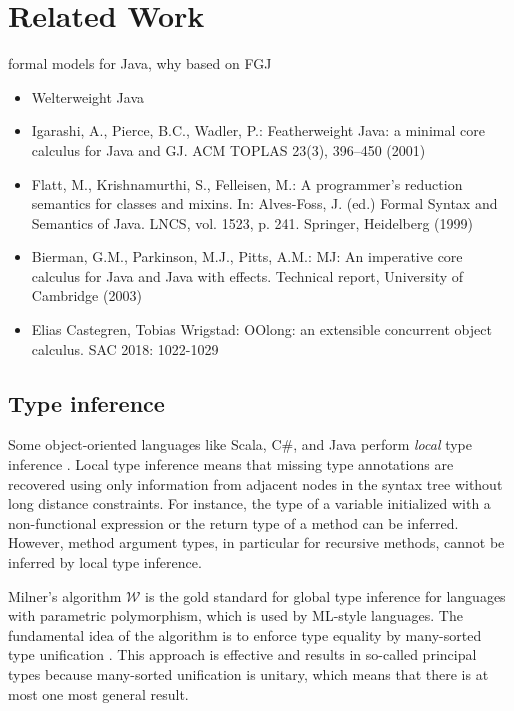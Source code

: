 \section{Related Work}
\label{sec:related-work}


formal models for Java, why based on FGJ

\begin{itemize}
\item Welterweight Java
\item Igarashi, A., Pierce, B.C., Wadler, P.: Featherweight Java: a
  minimal core calculus for Java and GJ. ACM TOPLAS 23(3), 396–450
  (2001)
\item Flatt, M., Krishnamurthi, S., Felleisen, M.: A programmer’s
  reduction semantics for classes and mixins. In: Alves-Foss, J. (ed.)
  Formal Syntax and Semantics of Java. LNCS, vol. 1523,
  p. 241. Springer, Heidelberg (1999)
\item Bierman, G.M., Parkinson, M.J., Pitts, A.M.: MJ: An imperative
  core calculus for Java and Java with effects. Technical report,
  University of Cambridge (2003) 
\item 	Elias Castegren, Tobias Wrigstad:
OOlong: an extensible concurrent object calculus. SAC 2018: 1022-1029
\end{itemize}

\subsection{Type inference}

Some object-oriented languages like Scala, C\#, and Java perform
\emph{local} type inference \cite{PT98,OZZ01}. Local type 
inference means that missing type annotations are recovered using only
information from adjacent nodes in the syntax tree without long distance
constraints. For instance, the type of a variable initialized with a
non-functional expression or the return type of a method can be
inferred. However, method argument types, in particular for recursive
methods, cannot be inferred by local type inference.

Milner's algorithm $\mathcal{W}$ \cite{DBLP:journals/jcss/Milner78} is
the gold standard for global type inference for languages with 
parametric polymorphism, which is used by ML-style languages. The fundamental idea
of the algorithm is to enforce type equality by many-sorted type
unification \cite{Rob65,MM82}. This approach is effective and results
in so-called principal types because many-sorted unification is
unitary, which means that there is at most one most general result.

